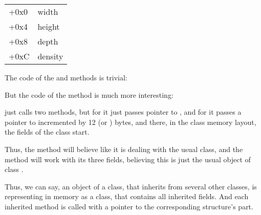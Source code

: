\begin{center}
\begin{tabular}{ | l | l | }
\hline
  \tableheader{} \\
\hline
  +0x0 & width \\
\hline
  +0x4 & height \\
\hline
  +0x8 & depth \\
\hline
  +0xC & density \\
\hline
\end{tabular}
\end{center}


The code of the  and  methods is trivial:






But the code of the  method is much more interesting:




 just calls two methods, but for  it just passes pointer to ,
and for  it passes a pointer to  incremented by 12 (or ) bytes, and there,
in the 
class memory layout, the fields of the  class start.


Thus, the  method will believe like it is dealing with the usual  class,
and the  method will work with its three fields, believing this is just the usual object of class .


Thus, we can say, an object of a class,
that inherits from several other classes, is representing in memory as a  class, that contains all inherited fields.
And each inherited method is called with a pointer to 
the corresponding structure's part.

